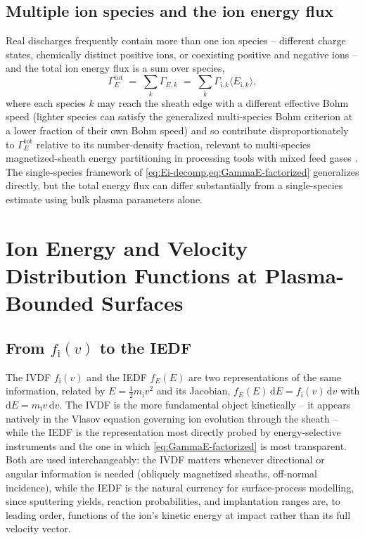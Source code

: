 \subsection{Multiple ion species and the ion energy flux}

Real discharges frequently contain more than one ion species -- different charge states, chemically distinct positive ions, or coexisting positive and negative ions -- and the total ion energy flux is a sum over species,
\begin{equation}
\Gamma_{E}^{\mathrm{tot}} \;=\; \sum_{k} \Gamma_{E,k} \;=\; \sum_{k} \Gamma_{\mathrm{i},k} \langle E_{\mathrm{i},k} \rangle,
\end{equation}
where each species $k$ may reach the sheath edge with a different effective Bohm speed (lighter species can satisfy the generalized multi-species Bohm criterion at a lower fraction of their own Bohm speed) and so contribute disproportionately to $\Gamma_{E}^{\mathrm{tot}}$ relative to its number-density fraction, relevant to multi-species magnetized-sheath energy partitioning in processing tools with mixed feed gases \cite{ref0088}. The single-species framework of \cref{eq:Ei-decomp,eq:GammaE-factorized} generalizes directly, but the total energy flux can differ substantially from a single-species estimate using bulk plasma parameters alone.

\section{Ion Energy and Velocity Distribution Functions at Plasma-Bounded Surfaces}

\subsection{From \texorpdfstring{$f_{\mathrm{i}}(v)$}{f\_i(v)} to the IEDF}

The IVDF $f_{\mathrm{i}}(v)$ and the IEDF $f_E(E)$ are two representations of the same information, related by $E = \tfrac12 m_{\mathrm{i}} v^2$ and its Jacobian, $f_E(E)\, \mathrm{d}E = f_{\mathrm{i}}(v)\, \mathrm{d}v$ with $\mathrm{d}E = m_{\mathrm{i}} v\, \mathrm{d}v$. The IVDF is the more fundamental object kinetically -- it appears natively in the Vlasov equation governing ion evolution through the sheath -- while the IEDF is the representation most directly probed by energy-selective instruments and the one in which \cref{eq:GammaE-factorized} is most transparent. Both are used interchangeably: the IVDF matters whenever directional or angular information is needed (obliquely magnetized sheaths, off-normal incidence), while the IEDF is the natural currency for surface-process modelling, since sputtering yields, reaction probabilities, and implantation ranges are, to leading order, functions of the ion's kinetic energy at impact rather than its full velocity vector.

